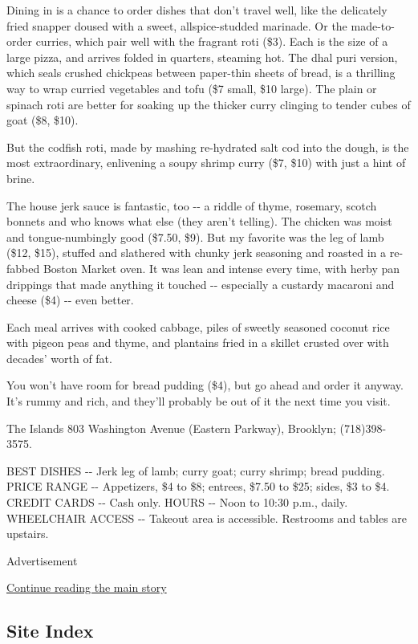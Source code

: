 Dining in is a chance to order dishes that don't travel well, like the
delicately fried snapper doused with a sweet, allspice-studded marinade.
Or the made-to-order curries, which pair well with the fragrant roti
(\$3). Each is the size of a large pizza, and arrives folded in
quarters, steaming hot. The dhal puri version, which seals crushed
chickpeas between paper-thin sheets of bread, is a thrilling way to wrap
curried vegetables and tofu (\$7 small, \$10 large). The plain or
spinach roti are better for soaking up the thicker curry clinging to
tender cubes of goat (\$8, \$10).

But the codfish roti, made by mashing re-hydrated salt cod into the
dough, is the most extraordinary, enlivening a soupy shrimp curry (\$7,
\$10) with just a hint of brine.

The house jerk sauce is fantastic, too -\/- a riddle of thyme, rosemary,
scotch bonnets and who knows what else (they aren't telling). The
chicken was moist and tongue-numbingly good (\$7.50, \$9). But my
favorite was the leg of lamb (\$12, \$15), stuffed and slathered with
chunky jerk seasoning and roasted in a re-fabbed Boston Market oven. It
was lean and intense every time, with herby pan drippings that made
anything it touched -\/- especially a custardy macaroni and cheese (\$4)
-\/- even better.

Each meal arrives with cooked cabbage, piles of sweetly seasoned coconut
rice with pigeon peas and thyme, and plantains fried in a skillet
crusted over with decades' worth of fat.

You won't have room for bread pudding (\$4), but go ahead and order it
anyway. It's rummy and rich, and they'll probably be out of it the next
time you visit.

The Islands 803 Washington Avenue (Eastern Parkway), Brooklyn;
(718)398-3575.

BEST DISHES -\/- Jerk leg of lamb; curry goat; curry shrimp; bread
pudding. PRICE RANGE -\/- Appetizers, \$4 to \$8; entrees, \$7.50 to
\$25; sides, \$3 to \$4. CREDIT CARDS -\/- Cash only. HOURS -\/- Noon to
10:30 p.m., daily. WHEELCHAIR ACCESS -\/- Takeout area is accessible.
Restrooms and tables are upstairs.

Advertisement

\protect\hyperlink{after-bottom}{Continue reading the main story}

\hypertarget{site-index}{%
\subsection{Site Index}\label{site-index}}

